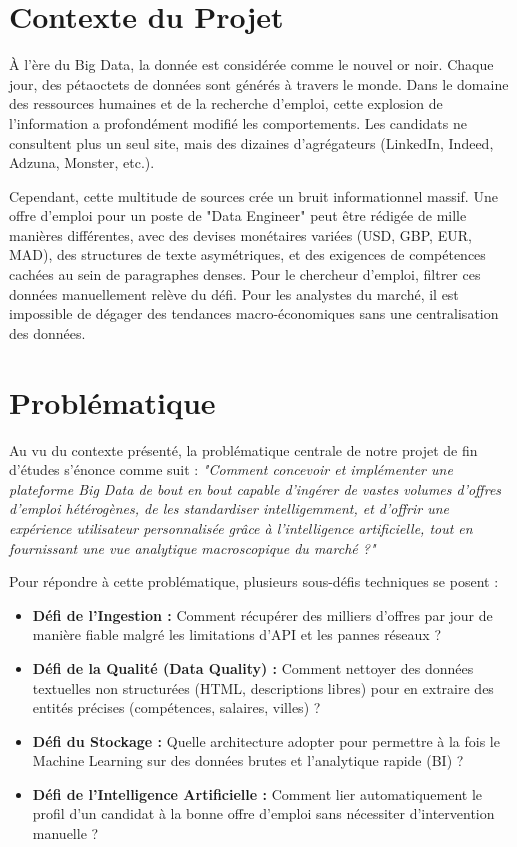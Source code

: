 \documentclass[12pt,a4paper,twoside]{report}
\begin{document}
\section{Contexte du Projet}
À l'ère du Big Data, la donnée est considérée comme le nouvel or noir. Chaque jour, des pétaoctets de données sont générés à travers le monde. Dans le domaine des ressources humaines et de la recherche d'emploi, cette explosion de l'information a profondément modifié les comportements. Les candidats ne consultent plus un seul site, mais des dizaines d'agrégateurs (LinkedIn, Indeed, Adzuna, Monster, etc.). 

Cependant, cette multitude de sources crée un bruit informationnel massif. Une offre d'emploi pour un poste de "Data Engineer" peut être rédigée de mille manières différentes, avec des devises monétaires variées (USD, GBP, EUR, MAD), des structures de texte asymétriques, et des exigences de compétences cachées au sein de paragraphes denses. Pour le chercheur d'emploi, filtrer ces données manuellement relève du défi. Pour les analystes du marché, il est impossible de dégager des tendances macro-économiques sans une centralisation des données.

\section{Problématique}
Au vu du contexte présenté, la problématique centrale de notre projet de fin d'études s'énonce comme suit :
\textit{"Comment concevoir et implémenter une plateforme Big Data de bout en bout capable d'ingérer de vastes volumes d'offres d'emploi hétérogènes, de les standardiser intelligemment, et d'offrir une expérience utilisateur personnalisée grâce à l'intelligence artificielle, tout en fournissant une vue analytique macroscopique du marché ?"}

Pour répondre à cette problématique, plusieurs sous-défis techniques se posent :
\begin{itemize}
    \item \textbf{Défi de l'Ingestion :} Comment récupérer des milliers d'offres par jour de manière fiable malgré les limitations d'API et les pannes réseaux ?
    \item \textbf{Défi de la Qualité (Data Quality) :} Comment nettoyer des données textuelles non structurées (HTML, descriptions libres) pour en extraire des entités précises (compétences, salaires, villes) ?
    \item \textbf{Défi du Stockage :} Quelle architecture adopter pour permettre à la fois le Machine Learning sur des données brutes et l'analytique rapide (BI) ?
    \item \textbf{Défi de l'Intelligence Artificielle :} Comment lier automatiquement le profil d'un candidat à la bonne offre d'emploi sans nécessiter d'intervention manuelle ?
\end{itemize}
\end{document}
